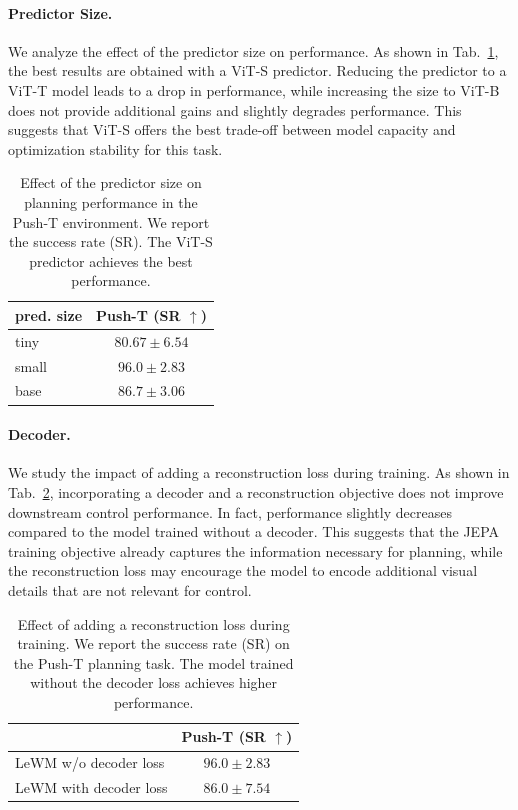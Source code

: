 \paragraph{Predictor Size.}
We analyze the effect of the predictor size on performance. As shown in Tab.~\ref{tab:pred-size}, the best results are obtained with a ViT-S predictor. Reducing the predictor to a ViT-T model leads to a drop in performance, while increasing the size to ViT-B does not provide additional gains and slightly degrades performance. This suggests that ViT-S offers the best trade-off between model capacity and optimization stability for this task.

\begin{table}
\centering
\caption{\small Effect of the predictor size on planning performance in the Push-T environment. We report the success rate (SR). The ViT-S predictor achieves the best performance.}
\begin{tabular}{l c}
\toprule
\textbf{pred. size} & \textbf{Push-T} (SR $\uparrow$)\\
\toprule
tiny & $80.67 \pm 6.54$\\
small & $\bm{96.0} \pm \bm{2.83}$\\
base & $86.7 \pm 3.06$\\
\bottomrule
\end{tabular}
\label{tab:pred-size}
\end{table}


\paragraph{Decoder.}
We study the impact of adding a reconstruction loss during training. As shown in Tab.~\ref{tab:decoder-loss}, incorporating a decoder and a reconstruction objective does not improve downstream control performance. In fact, performance slightly decreases compared to the model trained without a decoder. This suggests that the JEPA training objective already captures the information necessary for planning, while the reconstruction loss may encourage the model to encode additional visual details that are not relevant for control.


\begin{table}
\centering
\caption{\small Effect of adding a reconstruction loss during training. We report the success rate (SR) on the Push-T planning task. The model trained without the decoder loss achieves higher performance.}
\begin{tabular}{l c}
\toprule
 & \textbf{Push-T} (SR $\uparrow$)\\
\toprule
LeWM w/o decoder loss & $\bm{96.0} \pm \bm{2.83}$\\
LeWM with decoder loss & $86.0 \pm 7.54$\\
\bottomrule
\end{tabular}
\label{tab:decoder-loss}
\end{table}

